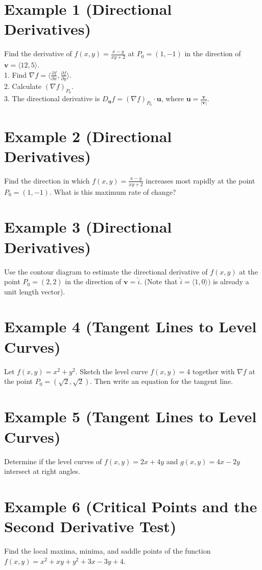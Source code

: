 \documentclass[11pt]{article}
\begin{document}
\section*{Example 1 (Directional Derivatives)}

Find the derivative of $f(x,y) =\frac{x-y}{xy+2}$ at $P_0 = (1,-1)$ in the direction of $\textbf{v} = \langle 12, 5 \rangle$.\\

1. Find $\nabla f = \langle \frac{\partial f}{\partial x}, \frac{\partial f}{\partial y} \rangle$.\\
2. Calculate $\left(\nabla f\right)_{P_0}$.\\
3. The directional derivative is $D_{\textbf{u}}f =\left(\nabla f\right)_{P_0}\cdot \textbf{u}$, where $\textbf{u} = \frac{\textbf{v}}{|\textbf{v}|}$.

\section*{Example 2 (Directional Derivatives)}

Find the direction in which $f(x,y) =\frac{x-y}{xy+2}$ increases most rapidly at the point $P_0 = (1,-1)$. What is this maximum rate of change?

\section*{Example 3 (Directional Derivatives)}

Use the contour diagram to estimate the directional derivative of $f(x,y)$ at the point $P_0 = (2,2)$ in the direction of $\textbf{v} = \hat{i}$. (Note that $\hat{i} = \langle 1, 0 \rangle)$ is already a unit length vector). 

\section*{Example 4 (Tangent Lines to Level Curves)}

Let $f(x,y) = x^2 + y^2$. Sketch the level curve $f(x,y) = 4$ together with $\nabla f$ at the point $P_0 = (\sqrt{2},\sqrt{2})$. Then write an equation for the tangent line. 

\section*{Example 5 (Tangent Lines to Level Curves)}

Determine if the level curves of $f(x,y) = 2x + 4y$ and $g(x,y) = 4x-2y$ intersect at right angles. 

\section*{Example 6 (Critical Points and the Second Derivative Test)}

Find the local maxima, minima, and saddle points of the function $f(x,y) = x^2 + xy + y^2 + 3x - 3y + 4$. 
\end{document}
